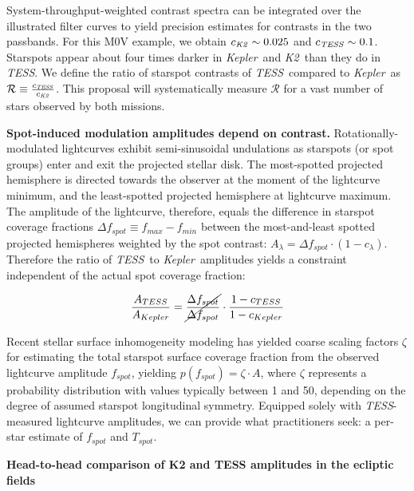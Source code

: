 \documentclass[letterpaper,12pt]{article}
\newcommand{\tess}{{\it TESS}}
\newcommand{\kepler}{{\it Kepler}}
\newcommand{\ktwo}{{\it K2}}
\begin{document}
System-throughput-weighted contrast spectra can be integrated over the illustrated filter curves to yield precision estimates for contrasts in the two passbands.  For this M0V example, we obtain $c_{\ktwo}\sim0.025$ and $c_{\tess}\sim0.1$.  Starspots appear about four times darker in \kepler\ and \ktwo\ than they do in \tess.  We define the ratio of starspot contrasts of \tess\ compared to \kepler\ as $\mathcal{R}\equiv \frac{c_{\tess}}{c_{\ktwo}}$.  This proposal will systematically measure $\mathcal{R}$ for a vast number of stars observed by both missions.



\textbf{Spot-induced modulation amplitudes depend on contrast.}
Rotationally-modulated lightcurves exhibit semi-sinusoidal undulations as starspots (or spot groups) enter and exit the projected stellar disk.  The most-spotted projected hemisphere is directed towards the observer at the moment of the lightcurve minimum, and the least-spotted projected hemisphere at lightcurve maximum.  The amplitude of the lightcurve, therefore, equals the difference in starspot coverage fractions $\Delta f_{spot} \equiv f_{max}-f_{min}$ between the most-and-least spotted projected hemispheres weighted by the spot contrast: $ A_\lambda = \Delta f_{spot} \cdot (1-c_\lambda)$.  Therefore the ratio of \tess\ to \kepler\ amplitudes yields a constraint independent of the actual spot coverage fraction:

$$ \frac{A_{TESS}}{A_{Kepler}} = \cancel{\frac{\Delta f_{spot}}{\Delta f_{spot}}} \cdot \frac{1-c_{TESS}}{1-c_{Kepler}} $$

Recent stellar surface inhomogeneity modeling \cite{2018ApJ...853..122R, 2018ApJ...868..143G, 2018ApJ...865..142B} has yielded coarse scaling factors $\zeta$ for estimating the total starspot surface coverage fraction from the observed lightcurve amplitude $f_{spot}$, yielding $ p(f_{spot}) = \zeta \cdot A $, where $\zeta$ represents a probability distribution with values typically between 1 and 50, depending on the degree of assumed starspot longitudinal symmetry.  Equipped solely with \tess-measured lightcurve amplitudes, we can provide what practitioners seek: a per-star estimate of $f_{spot}$ and $T_{spot}$.

\textbf{Head-to-head comparison of K2 and TESS amplitudes in the ecliptic fields}
\end{document}

